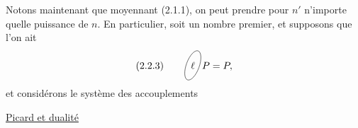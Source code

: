 Notons maintenant que moyennant (2.1.1), on peut prendre pour $n'$ n'importe quelle puissance de $n$. En particulier, soit  un nombre premier, et supposons que l'on ait
\[
(2.2.3)\qquad\figure{\begin{tikzpicture}[baseline=(l.base)]\node(l){$\ell$};\draw[rotate=-20](0,0)ellipse(.23 and .55);\end{tikzpicture}} P=P,
\]
et considérons le système des accouplements

\uline{Picard et dualité}

